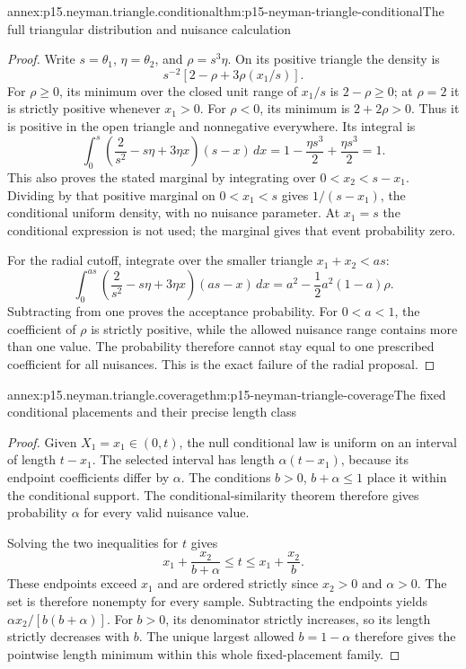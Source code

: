 \begin{annexitem}{annex:p15.neyman.triangle.conditional}{thm:p15-neyman-triangle-conditional}{The full triangular distribution and nuisance calculation}
\begin{proof}
Write \(s=\theta_1\), \(\eta=\theta_2\), and \(\rho=s^3\eta\).
On its positive triangle the density is
\[
                    s^{-2}[2-\rho+3\rho(x_1/s)].
\]
For \(\rho\geq0\), its minimum over the closed unit
range of \(x_1/s\) is \(2-\rho\geq0\); at \(\rho=2\)
it is strictly positive whenever \(x_1>0\).
For \(\rho<0\), its minimum is \(2+2\rho>0\).
Thus it is positive in the open triangle and nonnegative
everywhere. Its integral is
\[
 \int_0^s\left(\frac2{s^2}-s\eta+3\eta x\right)(s-x)\,dx
                  =1-\frac{\eta s^3}{2}+\frac{\eta s^3}{2}=1.
\]
This also proves the stated marginal by integrating
over \(0<x_2<s-x_1\). Dividing by that positive
marginal on \(0<x_1<s\) gives \(1/(s-x_1)\),
the conditional uniform density, with no nuisance
parameter. At \(x_1=s\) the conditional expression
is not used; the marginal gives that event probability zero.

For the radial cutoff, integrate over the smaller
triangle \(x_1+x_2<a s\):
\[
 \int_0^{as}\left(\frac2{s^2}-s\eta+3\eta x\right)(as-x)\,dx
                    =a^2-\frac12a^2(1-a)\rho.
\]
Subtracting from one proves the acceptance probability.
For \(0<a<1\), the coefficient of \(\rho\) is
strictly positive, while the allowed nuisance range
contains more than one value. The probability
therefore cannot stay equal to one prescribed
coefficient for all nuisances. This is the exact
failure of the radial proposal.
\end{proof}
\end{annexitem}

\begin{annexitem}{annex:p15.neyman.triangle.coverage}{thm:p15-neyman-triangle-coverage}{The fixed conditional placements and their precise length class}
\begin{proof}
Given \(X_1=x_1\in(0,t)\), the null conditional
law is uniform on an interval of length \(t-x_1\).
The selected interval has length \(\alpha(t-x_1)\),
because its endpoint coefficients differ by \(\alpha\).
The conditions \(b>0\), \(b+\alpha\leq1\)
place it within the conditional support.
The conditional-similarity theorem therefore gives
probability \(\alpha\) for every valid nuisance value.

Solving the two inequalities for \(t\) gives
\[
                 x_1+\frac{x_2}{b+\alpha}
                      \leq t\leq x_1+\frac{x_2}{b}.
\]
These endpoints exceed \(x_1\) and are ordered
strictly since \(x_2>0\) and \(\alpha>0\).
The set is therefore nonempty for every sample.
Subtracting the endpoints yields
\(\alpha x_2/[b(b+\alpha)]\).
For \(b>0\), its denominator strictly increases,
so its length strictly decreases with \(b\).
The unique largest allowed \(b=1-\alpha\)
therefore gives the pointwise length minimum
within this whole fixed-placement family.
\end{proof}
\end{annexitem}

